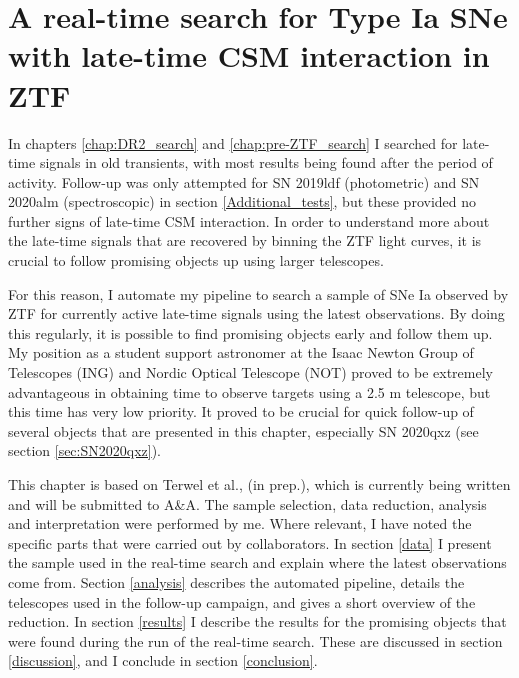 \documentclass[a4paper,oneside,12pt, class=Latex/Classes/PhDthesisPSnPDF, crop=false]{standalone}
\begin{document}
\doublespacing
\chapter{A real-time search for Type Ia SNe with late-time CSM interaction in ZTF}
\label{chap:Real-time}
In chapters \ref{chap:DR2_search} and \ref{chap:pre-ZTF_search} I searched for late-time signals in old transients, with most results being found after the period of activity. Follow-up was only attempted for SN 2019ldf (photometric) and SN 2020alm (spectroscopic) in section \ref{Additional_tests}, but these provided no further signs of late-time CSM interaction. In order to understand more about the late-time signals that are recovered by binning the ZTF light curves, it is crucial to follow promising objects up using larger telescopes.

For this reason, I automate my pipeline to search a sample of SNe Ia observed by ZTF for currently active late-time signals using the latest observations. By doing this regularly, it is possible to find promising objects early and follow them up. My position as a student support astronomer at the Isaac Newton Group of Telescopes (ING) and Nordic Optical Telescope (NOT) proved to be extremely advantageous in obtaining time to observe targets using a 2.5 m telescope, but this time has very low priority. It proved to be crucial for quick follow-up of several objects that are presented in this chapter, especially SN 2020qxz (see section \ref{sec:SN2020qxz}).

This chapter is based on Terwel et al., (in prep.), which is currently being written and will be submitted to A\&A. The sample selection, data reduction, analysis and interpretation were performed by me. Where relevant, I have noted the specific parts that were carried out by collaborators. In section \ref{data} I present the sample used in the real-time search and explain where the latest observations come from. Section \ref{analysis} describes the automated pipeline, details the telescopes used in the follow-up campaign, and gives a short overview of the reduction. In section \ref{results} I describe the results for the promising objects that were found during the run of the real-time search. These are discussed in section \ref{discussion}, and I conclude in section \ref{conclusion}.
\end{document}

